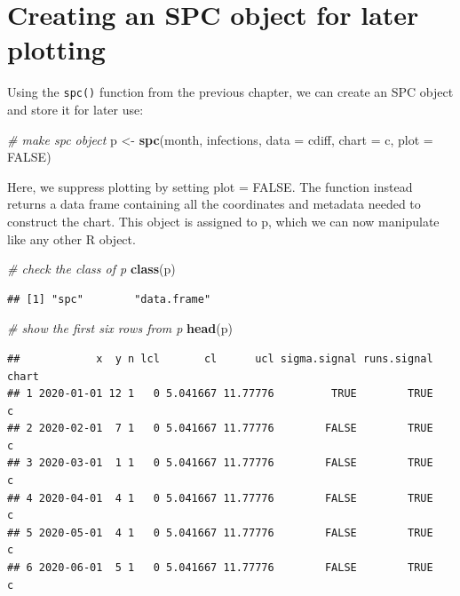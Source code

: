\documentclass[
]{book}
\newenvironment{Shaded}{\begin{snugshade}}{\end{snugshade}}
\newcommand{\AttributeTok}[1]{\textcolor[rgb]{0.13,0.29,0.53}{#1}}
\newcommand{\CommentTok}[1]{\textcolor[rgb]{0.56,0.35,0.01}{\textit{#1}}}
\newcommand{\ConstantTok}[1]{\textcolor[rgb]{0.56,0.35,0.01}{#1}}
\newcommand{\FunctionTok}[1]{\textcolor[rgb]{0.13,0.29,0.53}{\textbf{#1}}}
\newcommand{\NormalTok}[1]{#1}
\newcommand{\OtherTok}[1]{\textcolor[rgb]{0.56,0.35,0.01}{#1}}
\newcommand{\StringTok}[1]{\textcolor[rgb]{0.31,0.60,0.02}{#1}}
\begin{document}
\section{Creating an SPC object for later plotting}\label{creating-an-spc-object-for-later-plotting}

Using the \texttt{spc()} function from the previous chapter, we can create an SPC object and store it for later use:

\begin{Shaded}
\begin{Highlighting}[]
\CommentTok{\# make spc object}
\NormalTok{p }\OtherTok{\textless{}{-}} \FunctionTok{spc}\NormalTok{(month, infections,}
         \AttributeTok{data  =}\NormalTok{ cdiff,}
         \AttributeTok{chart =} \StringTok{\textquotesingle{}c\textquotesingle{}}\NormalTok{,}
         \AttributeTok{plot  =} \ConstantTok{FALSE}\NormalTok{)}
\end{Highlighting}
\end{Shaded}

Here, we suppress plotting by setting plot = FALSE. The function instead returns a data frame containing all the coordinates and metadata needed to construct the chart. This object is assigned to p, which we can now manipulate like any other R object.

\begin{Shaded}
\begin{Highlighting}[]
\CommentTok{\# check the class of p}
\FunctionTok{class}\NormalTok{(p)}
\end{Highlighting}
\end{Shaded}

\begin{verbatim}
## [1] "spc"        "data.frame"
\end{verbatim}

\begin{Shaded}
\begin{Highlighting}[]
\CommentTok{\# show the first six rows from p}
\FunctionTok{head}\NormalTok{(p)}
\end{Highlighting}
\end{Shaded}

\begin{verbatim}
##            x  y n lcl       cl      ucl sigma.signal runs.signal chart
## 1 2020-01-01 12 1   0 5.041667 11.77776         TRUE        TRUE     c
## 2 2020-02-01  7 1   0 5.041667 11.77776        FALSE        TRUE     c
## 3 2020-03-01  1 1   0 5.041667 11.77776        FALSE        TRUE     c
## 4 2020-04-01  4 1   0 5.041667 11.77776        FALSE        TRUE     c
## 5 2020-05-01  4 1   0 5.041667 11.77776        FALSE        TRUE     c
## 6 2020-06-01  5 1   0 5.041667 11.77776        FALSE        TRUE     c
\end{verbatim}
\end{document}
